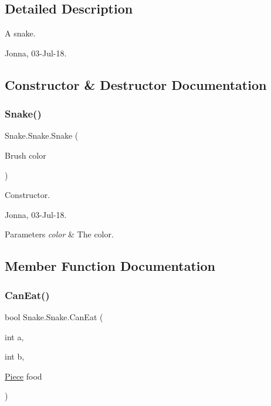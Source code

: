 \subsection{Detailed Description}
A snake. 

Jonna, 03-\/\+Jul-\/18. 

\subsection{Constructor \& Destructor Documentation}
\mbox{\label{class_snake_1_1_snake_a8380566e1a2f23802f4656a72da76412}} 
\subsubsection{\texorpdfstring{Snake()}{Snake()}}
{\footnotesize\ttfamily Snake.\+Snake.\+Snake (\begin{DoxyParamCaption}\item[{Brush}]{color }\end{DoxyParamCaption})}



Constructor. 

Jonna, 03-\/\+Jul-\/18. 


\begin{DoxyParams}{Parameters}
{\em color} & The color. \\
\hline
\end{DoxyParams}


\subsection{Member Function Documentation}
\mbox{\label{class_snake_1_1_snake_a87e93fe5139973a667ecda894769349f}} 
\subsubsection{\texorpdfstring{Can\+Eat()}{CanEat()}}
{\footnotesize\ttfamily bool Snake.\+Snake.\+Can\+Eat (\begin{DoxyParamCaption}\item[{int}]{a,  }\item[{int}]{b,  }\item[{\mbox{\hyperlink{class_snake_1_1_piece}{Piece}}}]{food }\end{DoxyParamCaption})}



